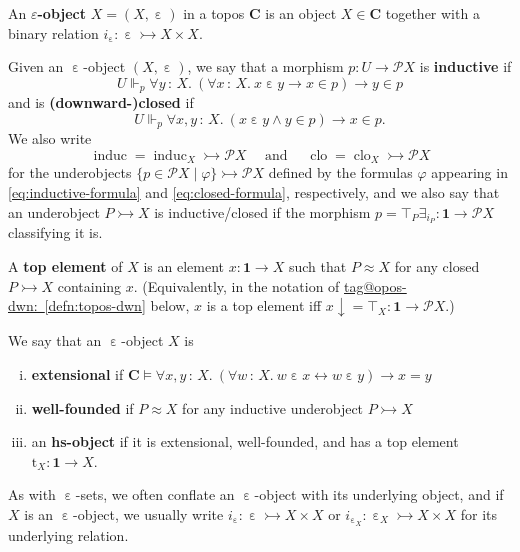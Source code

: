 \documentclass{amsart}
\makeatletter
\newcommand\AND{\text{ and }}
\newcommand\bC{\mathbf{C}}
\newcommand\clo{\operatorname{clo}}
\newcommand\defword[1]{{\boldmath \textbf{#1}}}
\newcommand\dwn{\mathpunct{\downarrow}}
\newcommand\ein{\mathrel{\varepsilon}}
\newcommand\induc{\operatorname{induc}}
\renewcommand\phi{\varphi}
\newcommand\pow{\mathcal{P}}
\newcommand\rt{\mathrm{t}}
\newcommand\set[2][]{#1\{ #2 #1\}}
\newcommand\tm{\mathbf{1}}
\newcommand\tolon{{\,:\,}}
\newcommand\tot{\leftrightarrow}
\newcommand\tto{\rightarrowtail}
\newcommand\unein{{\ein}}
\newcommand\tagword[1]{\csname tag@#1\endcsname}
\def\label@tag#1:#2\@nil{#1}
\newcommand\labeltag[1]{\label@tag#1:\@nil}
\newcommand\jref[1]{%
  \texorpdfstring%
    {\hyperref[#1]{\tagword{\labeltag{#1}}~\ref*{#1}}}%
    {\tagword{\labeltag{#1}}~\ref*{#1}}%
}
\theoremstyle{definition}
\theoremstyle{remark}
\theoremstyle{plainwithref}
\makeatother
\begin{document}
\begin{defn} \label{defn:topos-ein-hs}
  An \defword{\( \varepsilon \)-object} \( X = (X, \unein) \) in a topos \( \bC \) is an object \( X \in \bC \) together with a binary relation \( i_{\unein} \colon \unein \tto X \times X \).

  Given an \( \unein \)-object \( (X, \ein) \), we say that a morphism \( p \colon U \to \pow X \) is \defword{inductive} if
  \begin{equation} \label{eq:inductive-formula}
    U \Vdash_p \forall y \tolon X.\ (\forall x \tolon X.\ x \ein y \to x \in p) \to y \in p
  \end{equation}
  and is \defword{(downward-)closed} if
  \begin{equation} \label{eq:closed-formula}
    U \Vdash_p \forall x,y \tolon X.\ (x \ein y \wedge y \in p) \to x \in p.
  \end{equation}
  We also write
  \[
    \induc = \induc_X \tto \pow X
    \quad \AND \quad
    \clo = \clo_X \tto \pow X
  \]
  for the underobjects \( \set{ p \in \pow X \mid \phi } \tto \pow X \) defined by the formulas \( \phi \) appearing in \eqref{eq:inductive-formula} and \eqref{eq:closed-formula}, respectively, and we also say that an underobject \( P \tto X \) is inductive/closed if the morphism \( p = \top_P \exists_{i_P} \colon \tm \to \pow X \) classifying it is.

  A \defword{top element} of \( X \) is an element \( x \colon \tm \to X \) such that \( P \approx X \) for any closed \( P \tto X \) containing \( x \).
  (Equivalently, in the notation of \jref{defn:topos-dwn} below, \( x \) is a top element iff \( x \dwn = \top_X \colon \tm \to \pow X \).)

  We say that an \( \unein \)-object \( X \) is
  \begin{enumerate}[(i)]
  \item \defword{extensional} if
    \( \bC \vDash \forall x,y \tolon X.\ (\forall w \tolon X.\ w \ein x \tot w \ein y) \to x = y \)
  \item \defword{well-founded} if \( P \approx X \) for any inductive underobject \( P \tto X \)
  \item an \defword{hs-object} if it is extensional, well-founded, and has a top element \( \rt_X \colon \tm \to X \).
  \end{enumerate}
  As with \( \unein \)-sets, we often conflate an \( \unein \)-object with its underlying object, and if \( X \) is an \( \unein \)-object, we usually write \( i_{\unein} \colon \unein \tto X \times X \) or \( i_{\unein_X} \colon \unein_X \tto X \times X \) for its underlying relation.
\end{defn}
\end{document}
